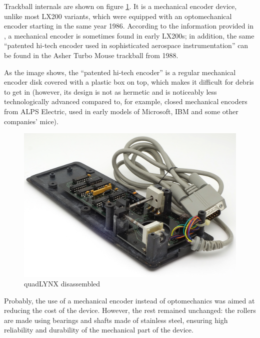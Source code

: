 \documentclass[11pt, a4paper]{article}
\begin{document}
Trackball internals are shown on figure \ref{fig:quadLYNXInside}. It is a mechanical encoder device, unlike most LX200 variants, which were equipped with an optomechanical encoder starting in the same year 1986. According to the information provided in \cite{lx200}, a mechanical encoder is sometimes found in early LX200s; in addition, the same ``patented hi-tech encoder used in sophisticated aerospace instrumentation'' \cite{turbo} can be found in the Asher Turbo Mouse trackball from 1988. 

As the image shows, the ``patented hi-tech encoder'' is a regular mechanical encoder disk covered with a plastic box on top, which makes it difficult for debris to get in (however, its design is not as hermetic and is noticeably less technologically advanced compared to, for example, closed mechanical encoders from ALPS Electric, used in early models of Microsoft, IBM and some other companies' mice).

\begin{figure}[h]
    \centering
    \includegraphics[scale=0.6]{1986_honeywell_asher_quadlynx_trackball/inside_30.jpg}
    \caption{quadLYNX disassembled}
    \label{fig:quadLYNXInside}
\end{figure}

Probably, the use of a mechanical encoder instead of optomechanics was aimed at reducing the cost of the device. However, the rest remained unchanged: the rollers are made using bearings and shafts made of stainless steel, ensuring high reliability and durability of the mechanical part of the device.
\end{document}
